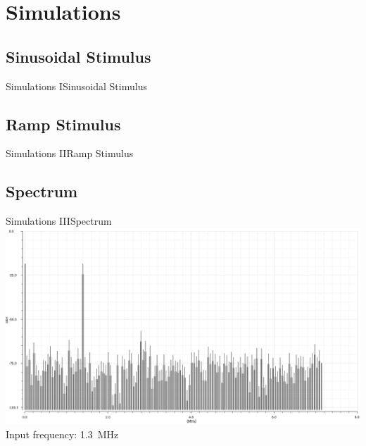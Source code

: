 \documentclass{beamer}
\begin{document}
 \section{Simulations}
 \subsection{Sinusoidal Stimulus}
 \begin{frame}{Simulations I}{Sinusoidal Stimulus}
  \centering
  \resizebox{!}{0.8\textheight}{}
 \end{frame}

 \subsection{Ramp Stimulus}
 \begin{frame}{Simulations II}{Ramp Stimulus}
  \centering
  \resizebox{!}{0.8\textheight}{}
 \end{frame}

 \subsection{Spectrum}
 \begin{frame}{Simulations III}{Spectrum}
  \centering
  \includegraphics[width=\textwidth]{img/fft}
  Input frequency: \SI{1.3}{\MHz}
 \end{frame}
 \AtBeginSection[]{}
 
\end{document}

